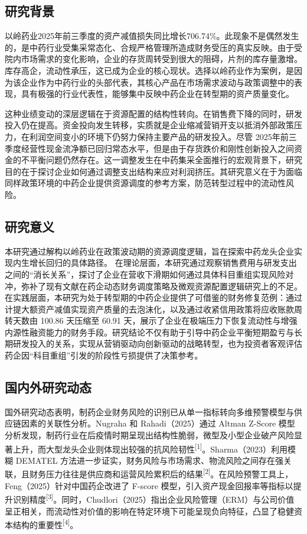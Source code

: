 \documentclass[12pt,a4paper,fontset=windows,UTF8]{ctexart}
\begin{document}
\subsection{研究背景}
以岭药业2025年前三季度的资产减值损失同比增长706.74\%。此现象不是偶然发生的，是中药行业受集采常态化、合规严格管理所造成财务受压的真实反映。由于受院内市场需求的变化影响，企业的存货周转受到很大的阻碍，片剂的库存量激增。库存高企，流动性承压，这已成为企业的核心现状。选择以岭药业作为案例，是因为该企业作为中药行业的头部代表，其核心产品在市场需求波动与政策调整中的表现，具有极强的行业代表性，能够集中反映中药企业在转型期的资产质量变化。

这种业绩变动的深层逻辑在于资源配置的结构性转向。在销售费下降的同时，研发投入仍在提高。资金投向发生转移，实质就是企业缩减营销开支以抵消外部政策压力，在利润空间变小的环境下仍努力保持主要产品的研发投入。尽管 2025年前三季度经营性现金流净额已回归常态水平，但是由于存货跌价和刚性创新投入之间资金的不平衡问题仍然存在。这一调整发生在中药集采全面推行的宏观背景下，研究目的在于探讨企业如何通过调整支出结构来应对利润挤压。其研究意义在于为面临同样政策环境的中药企业提供资源调度的参考方案，防范转型过程中的流动性风险。

\subsection{研究意义}
本研究通过解构以岭药业在政策波动期的资源调度逻辑，旨在探索中药龙头企业实现内生增长回归的具体路径。 在理论层面，本研究通过观察销售费用与研发支出之间的“消长关系”，探讨了企业在营收下滑期如何通过具体科目重组实现风险对冲，弥补了现有文献在药企动态财务调度策略及微观资源配置逻辑研究上的不足。在实践层面，本研究为处于转型期的中药企业提供了可借鉴的财务修复范例：通过计提大额资产减值实现资产质量的去泡沫化，以及通过收紧信用政策将应收账款周转天数由 100.86 天压缩至 60.91 天，展示了企业在极端压力下恢复流动性与增强内源性融资能力的财务手段。研究结论不仅有助于引导中药企业平衡短期盈亏与长期研发投入的关系，实现从营销驱动向创新驱动的战略转型，也为投资者客观评估药企因“科目重组”引发的阶段性亏损提供了决策参考。

\subsection{国内外研究动态}
国外研究动态表明，制药企业财务风险的识别已从单一指标转向多维预警模型与供应链因素的关联性分析。Nugraha 和 Rahadi（2025）通过 Altman Z-Score 模型分析发现，制药行业在后疫情时期呈现出结构性脆弱，微型及小型企业破产风险显著上升，而大型龙头企业则体现出较强的抗风险韧性\textsuperscript{[1]}。Sharma（2023）利用模糊 DEMATEL 方法进一步证实，财务风险与市场需求、物流风险之间存在强关联，且财务压力往往是供应商和运营风险累积后的结果\textsuperscript{[2]}。在风险预警工具上，Feng（2025）针对中国药企改进了 F-score 模型，引入资产现金回报率等指标以提升识别精度\textsuperscript{[3]}。同时，Chudlori（2025）指出企业风险管理（ERM）与公司价值呈正相关，而流动性对价值的影响在特定环境下可能呈现负向特征，凸显了稳健资本结构的重要性\textsuperscript{[4]}。
\end{document}
